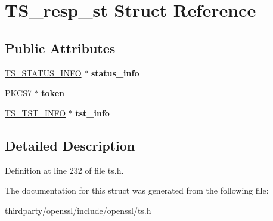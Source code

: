 \hypertarget{struct_t_s__resp__st}{}\section{T\+S\+\_\+resp\+\_\+st Struct Reference}
\label{struct_t_s__resp__st}
\subsection*{Public Attributes}
\begin{DoxyCompactItemize}
\item 
\mbox{\label{struct_t_s__resp__st_a9bd656baceb73a81e2cb3b41799c8dc0}} 
\hyperlink{struct_t_s__status__info__st}{T\+S\+\_\+\+S\+T\+A\+T\+U\+S\+\_\+\+I\+N\+FO} $\ast$ {\bfseries status\+\_\+info}
\item 
\mbox{\label{struct_t_s__resp__st_afaf455ead8fb6b4c236f8c6c28eb458d}} 
\hyperlink{structpkcs7__st}{P\+K\+C\+S7} $\ast$ {\bfseries token}
\item 
\mbox{\label{struct_t_s__resp__st_a79930775dd736e54ec3b762292e654e6}} 
\hyperlink{struct_t_s__tst__info__st}{T\+S\+\_\+\+T\+S\+T\+\_\+\+I\+N\+FO} $\ast$ {\bfseries tst\+\_\+info}
\end{DoxyCompactItemize}


\subsection{Detailed Description}


Definition at line 232 of file ts.\+h.



The documentation for this struct was generated from the following file\+:\begin{DoxyCompactItemize}
\item 
thirdparty/openssl/include/openssl/ts.\+h\end{DoxyCompactItemize}
